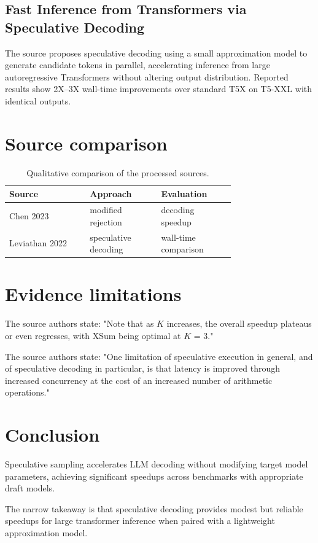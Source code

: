 \documentclass[conference]{IEEEtran}
\begin{document}
\subsection{Fast Inference from Transformers via Speculative Decoding}
The source proposes speculative decoding using a small approximation model to generate candidate tokens in parallel, accelerating inference from large autoregressive Transformers without altering output distribution. Reported results show 2X–3X wall-time improvements over standard T5X on T5-XXL with identical outputs. \cite{leviathan2022fast}

\section{Source comparison}
\begin{table}[H]\centering
\begin{tabular}{|>{\raggedright\arraybackslash}p{0.26\linewidth}|>{\raggedright\arraybackslash}p{0.235\linewidth}|>{\raggedright\arraybackslash}p{0.235\linewidth}|}\hline
Source & Approach & Evaluation \\ \hline
Chen 2023 \cite{chen2023accelerating} & modified rejection & decoding speedup \\ \hline
Leviathan 2022 \cite{leviathan2022fast} & speculative decoding & wall-time comparison \\ \hline
\end{tabular}\caption{Qualitative comparison of the processed sources.}\end{table}
\section{Evidence limitations}
The source authors state: "Note that as \ensuremath{\mathit{K}}
increases, the overall speedup plateaus or even regresses, with XSum being optimal at \ensuremath{\mathit{K}} = 3." \cite{chen2023accelerating}

The source authors state: "One limitation of speculative execution in general, and of
speculative decoding in particular, is that latency is improved through increased concurrency at the cost of an increased number of arithmetic operations." \cite{leviathan2022fast}

\section{Conclusion}
Speculative sampling accelerates LLM decoding without modifying target model parameters, achieving significant speedups across benchmarks with appropriate draft models. \cite{chen2023accelerating}

The narrow takeaway is that speculative decoding provides modest but reliable speedups for large transformer inference when paired with a lightweight approximation model. \cite{leviathan2022fast}



\end{document}
